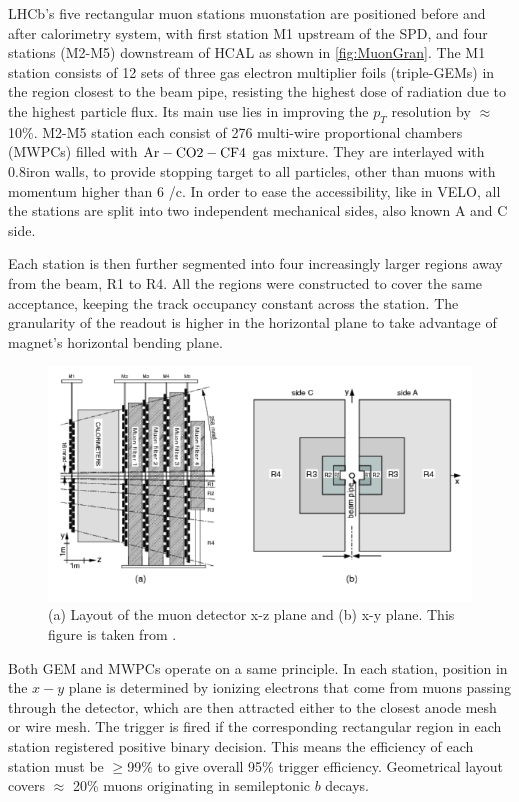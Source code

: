 \Gls{LHCb}'s five rectangular muon stations \Gls{muonstation} are positioned before and after calorimetry system, with first station M1 upstream of the \Gls{SPD}, and four stations (M2-M5) downstream of \Gls{HCAL} as shown in \autoref{fig:MuonGran}. The M1 station consists of 12 sets of three gas electron 
multiplier foils (triple-GEMs) in the region closest to the beam pipe, resisting the highest dose of radiation due to the highest particle flux. Its main use lies in improving the $p_{T}$ resolution by $\approx$ 10\%. M2-M5 station each consist of 276 multi-wire proportional chambers (\Gls{MWPCs}) filled with  $\rm{Ar-CO2-CF4}$ gas mixture. They are interlayed with 0.8\m iron walls, to provide stopping target to all particles, other than muons with momentum higher than $6$ \gev/c. In order to ease the accessibility, like in \Gls{VELO}, all the stations are split into two independent mechanical sides, also known A and C side.

Each station is then further segmented into four increasingly larger regions away from the beam, R1 to R4.
 All the regions were constructed to cover the same acceptance, keeping the track occupancy constant across the station. The granularity of the readout is higher in the horizontal plane to take advantage of magnet's horizontal bending plane.




\begin{figure}[!h]
	\centering
	\includegraphics[width = 1.0\textwidth]{figs/detector/MuonGran.png}%
	\caption{(a) Layout of the muon detector x-z plane and (b) x-y plane. This figure is taken from \cite{LHCb-DP-2012-002}. }  
	\label{fig:MuonGran}
\end{figure}

Both GEM and \Gls{MWPCs} operate on a same principle. In each station, position in the $x-y$ plane is determined by ionizing electrons that come from muons passing through the detector, which are then attracted either to the closest anode mesh or wire mesh. The trigger is fired if the corresponding rectangular region in each station registered positive binary decision. This means the efficiency of each station must be $\geq$99\% to give overall 95\% trigger efficiency. Geometrical layout covers $\approx$ 20\% muons originating in semileptonic $b$ decays.


